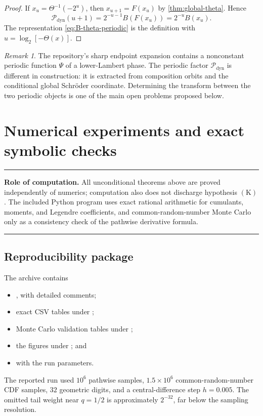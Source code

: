 \documentclass[11pt,oneside]{article}
\theoremstyle{definition}
\theoremstyle{remark}
\newtheorem{remark}[theorem]{Remark}
\newenvironment{statusbox}{%
  \par\smallskip\noindent\begin{center}\begin{minipage}{0.94\textwidth}%
  \hrule\vspace{0.55em}\small
}{%
  \vspace{0.55em}\hrule\end{minipage}\end{center}\smallskip
}
\begin{document}
\begin{proof}
If \(x_u=\Theta^{-1}(-2^u)\), then
\(
 x_{u+1}=F(x_u)
\)
by \cref{thm:global-theta}.  Hence
\[
 \mathcal P_{\mathrm{dyn}}(u+1)
 =2^{-u-1}B(F(x_u))
 =2^{-u}B(x_u).
\]
The representation \eqref{eq:B-theta-periodic} is the definition with
\(u=\log_2[-\Theta(x)]\).
\end{proof}

\begin{remark}
The repository's sharp endpoint expansion contains a nonconstant periodic function
\(\Psi\) of a lower-Lambert phase.  The periodic factor
\(\mathcal P_{\mathrm{dyn}}\) is different in construction: it is extracted from composition
orbits and the conditional global Schr\"oder coordinate.  Determining the transform between the two
periodic objects is one of the main open problems proposed below.
\end{remark}

\section{Numerical experiments and exact symbolic checks}
\label{sec:numerics}

\begin{statusbox}
\textbf{Role of computation.}
All unconditional theorems above are proved independently of numerics; computation also does
not discharge hypothesis \(\mathrm{(K)}\).  The included Python program uses exact rational
arithmetic for cumulants, moments, and Legendre coefficients, and common-random-number Monte
Carlo only as a consistency check of the pathwise derivative formula.
\end{statusbox}

\subsection{Reproducibility package}

The archive contains
\begin{itemize}
\item {}, with detailed comments;
\item exact CSV tables under ;
\item Monte Carlo validation tables under ;
\item the figures under ; and
\item {} with the run parameters.
\end{itemize}
The reported run used \(10^6\) pathwise samples, \(1.5\times10^6\) common-random-number CDF
samples, \(32\) geometric digits, and a central-difference step \(h=0.005\).  The omitted tail
weight near \(q=1/2\) is approximately \(2^{-32}\), far below the sampling resolution.
\end{document}
